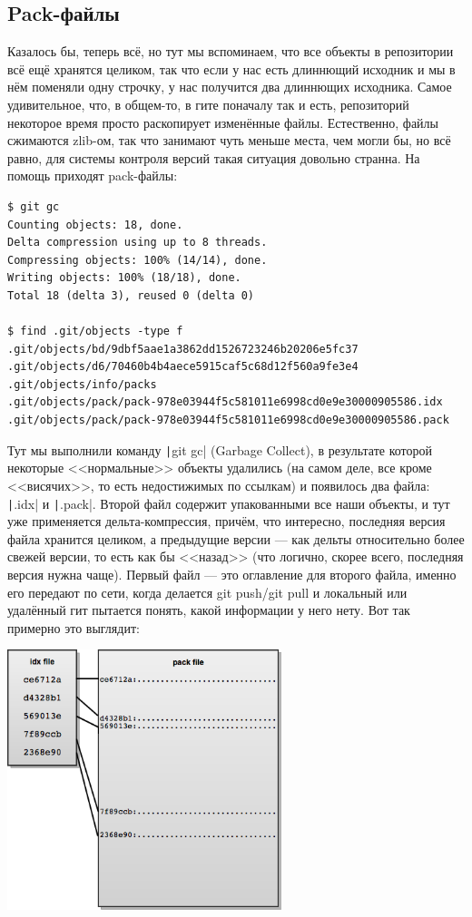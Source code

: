 \documentclass{../text-style}
\begin{document}
\subsection{Pack-файлы}

Казалось бы, теперь всё, но тут мы вспоминаем, что все объекты в репозитории всё ещё хранятся целиком, так что если у нас есть длиннющий исходник и мы в нём поменяли одну строчку, у нас получится два длиннющих исходника. Самое удивительное, что, в общем-то, в гите поначалу так и есть, репозиторий некоторое время просто раскопирует изменённые файлы. Естественно, файлы сжимаются zlib-ом, так что занимают чуть меньше места, чем могли бы, но всё равно, для системы контроля версий такая ситуация довольно странна. На помощь приходят pack-файлы:

\begin{verbatim}
$ git gc
Counting objects: 18, done.
Delta compression using up to 8 threads.
Compressing objects: 100% (14/14), done.
Writing objects: 100% (18/18), done.
Total 18 (delta 3), reused 0 (delta 0)

$ find .git/objects -type f
.git/objects/bd/9dbf5aae1a3862dd1526723246b20206e5fc37
.git/objects/d6/70460b4b4aece5915caf5c68d12f560a9fe3e4
.git/objects/info/packs
.git/objects/pack/pack-978e03944f5c581011e6998cd0e9e30000905586.idx
.git/objects/pack/pack-978e03944f5c581011e6998cd0e9e30000905586.pack
\end{verbatim}

Тут мы выполнили команду \texttt|git gc| (Garbage Collect), в результате которой некоторые <<нормальные>> объекты удалились (на самом деле, все кроме <<висячих>>, то есть недостижимых по ссылкам) и появилось два файла: \texttt|.idx| и \texttt|.pack|. Второй файл содержит упакованными все наши объекты, и тут уже применяется дельта-компрессия, причём, что интересно, последняя версия файла хранится целиком, а предыдущие версии --- как дельты относительно более свежей версии, то есть как бы <<назад>> (что логично, скорее всего, последняя версия нужна чаще). Первый файл --- это оглавление для второго файла, именно его передают по сети, когда делается git push/git pull и локальный или удалённый гит пытается понять, какой информации у него нету. Вот так примерно это выглядит:

\begin{center}
    \includegraphics[width=0.6\textwidth]{gitPackFiles.png}
\end{center}
\end{document}
